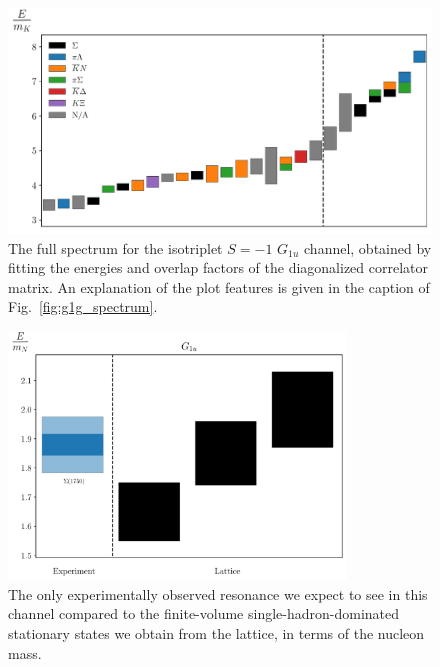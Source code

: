 \begin{figure}[H]
    \centering
    \hspace*{-0.5in}\includegraphics[width=\textwidth]{figures/sigmas/g1u/staircase_mk.pdf}
    \caption{The full spectrum for the isotriplet $S=-1$ $G_{1u}$ channel, obtained by fitting the energies and overlap factors of the diagonalized correlator matrix. An explanation of the plot features is given in the caption of Fig.~\ref{fig:g1g_spectrum}.}\label{fig:g1u_spectrum}
\end{figure}

\begin{figure}[H]
    \centering
    \includegraphics[width=0.8\textwidth]{figures/sigmas/g1u/expvslat.pdf}
    \caption{The only experimentally observed resonance we expect to see in this channel compared to the finite-volume single-hadron-dominated stationary states we obtain from the lattice, in terms of the nucleon mass.}\label{fig:g1u_exp}
\end{figure}

